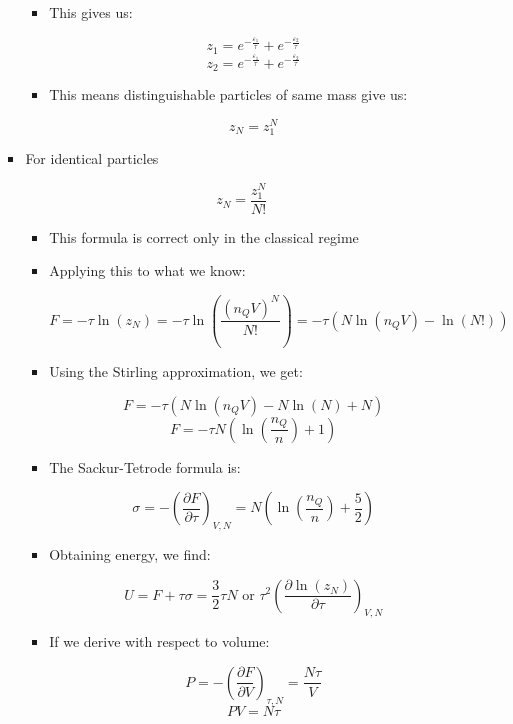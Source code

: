 \begin{itemize}
\begin{itemize}
\begin{itemize}
\begin{itemize}
              \item This gives us:

                $$z_1=e^{-\frac{\varepsilon_1}{\tau}}+e^{-\frac{\varepsilon_2}{\tau}}$$
                $$z_2=e^{-\frac{\varepsilon_1}{\tau}}+e^{-\frac{\varepsilon_2}{\tau}}$$

              \item This means distinguishable particles of same mass give us:

                $$z_N=z_1^N$$

            \end{itemize}

          \item For identical particles

            $$z_N=\frac{z_1^N}{N!}$$

            \begin{itemize}

              \item This formula is correct only in the classical regime

              \item Applying this to what we know:

                $$F=-\tau\ln(z_N)=-\tau\ln\left( \frac{(n_QV)^N}{N!} \right)=-\tau\left( N\ln(n_QV)-\ln(N!) \right)$$

              \item Using the Stirling approximation, we get:

                $$F=-\tau\left( N\ln(n_QV)-N\ln(N)+N \right)$$
                $$F=-\tau N\left( \ln\left(\frac{n_Q}{n}\right)+1 \right)$$

              \item The Sackur-Tetrode formula is:

                $$\sigma=-\left( \frac{\partial F}{\partial \tau}\right)_{V,N}=N\left( \ln\left( \frac{n_Q}{n}\right)+\frac{5}{2}  \right)$$

              \item Obtaining energy, we find:

                $$U=F+\tau\sigma=\frac{3}{2}\tau N\text{ or }\tau^2\left( \frac{\partial\ln(z_N)}{\partial\tau} \right)_{V,N}$$

              \item If we derive with respect to volume:

                $$P=-\left( \frac{\partial F}{\partial V} \right)_{\tau,N}=\frac{N\tau}{V}$$
                $$PV=N\tau$$


\end{itemize}
\end{itemize}
\end{itemize}
\end{itemize}
